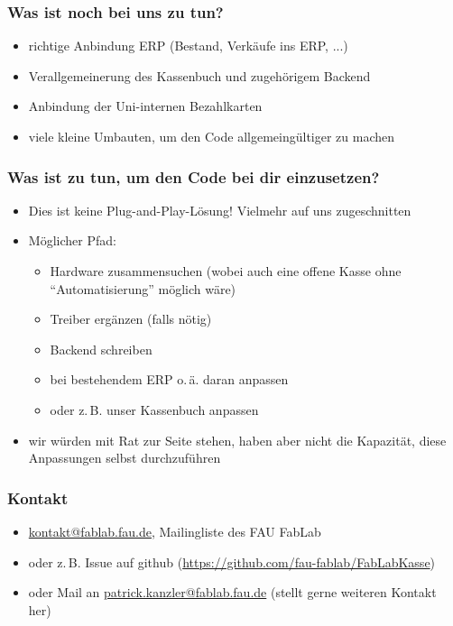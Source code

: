 \documentclass[german]{beamer} %
\begin{document}
\begin{frame}
\frametitle{Was ist noch bei uns zu tun?}
 \begin{itemize}
   \item richtige Anbindung ERP (Bestand, Verkäufe ins ERP, ...)
   \item Verallgemeinerung des Kassenbuch und zugehörigem Backend
   \item Anbindung der Uni-internen Bezahlkarten
   \item viele kleine Umbauten, um den Code allgemeingültiger zu machen
 \end{itemize} 
\end{frame}

\begin{frame}
\frametitle{Was ist zu tun, um den Code bei dir einzusetzen?}
  \begin{itemize}
    \item Dies ist keine Plug-and-Play-Lösung! Vielmehr auf uns zugeschnitten
    \item Möglicher Pfad:
      \begin{itemize}
         \item Hardware zusammensuchen (wobei auch eine offene Kasse ohne \enquote{Automatisierung} möglich wäre)
         \item Treiber ergänzen (falls nötig)
         \item Backend schreiben
         \item bei bestehendem ERP o.\,ä. daran anpassen
         \item oder z.\,B. unser Kassenbuch anpassen
      \end{itemize}
    \item wir würden mit Rat zur Seite stehen, haben aber nicht die Kapazität, diese Anpassungen selbst durchzuführen
  \end{itemize}
\end{frame}

\begin{frame}
\frametitle{Kontakt}
 \begin{itemize}
  \item \url{kontakt@fablab.fau.de}, Mailingliste des FAU FabLab
  \item oder z.\,B. Issue auf github (\url{https://github.com/fau-fablab/FabLabKasse})
  \item oder Mail an \url{patrick.kanzler@fablab.fau.de} (stellt gerne weiteren Kontakt her)
 \end{itemize}
\end{frame}
\end{document}
